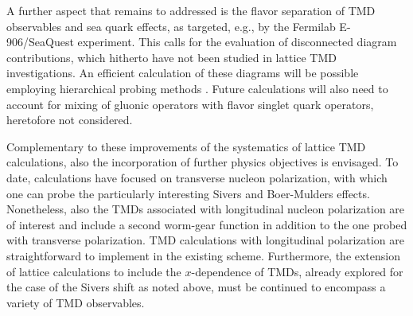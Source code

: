 
A further aspect that remains to addressed is the flavor separation
of TMD observables and sea quark effects, as targeted, e.g., by the Fermilab
E-906/SeaQuest experiment. This calls for the evaluation of disconnected
diagram contributions, which hitherto have not been studied in lattice TMD
investigations. An efficient calculation of these diagrams will be possible
employing hierarchical probing methods \cite{Stathopoulos:2013aci}.
Future calculations will also need to account for mixing of gluonic
operators with flavor singlet quark operators, heretofore not considered.

Complementary to these improvements of the systematics of lattice TMD
calculations, also the incorporation of further physics objectives is
envisaged. To date, calculations have focused on transverse nucleon
polarization, with which one can probe the particularly interesting
Sivers and Boer-Mulders effects. Nonetheless, also the TMDs associated
with longitudinal nucleon polarization are of interest and include a
second worm-gear function in addition to the one probed with transverse
polarization. TMD calculations with longitudinal polarization are
straightforward to implement in the existing scheme. Furthermore, the
extension of lattice calculations to include the $x$-dependence of TMDs,
already explored for the case of the Sivers shift as noted above, must be
continued to encompass a variety of TMD observables.

